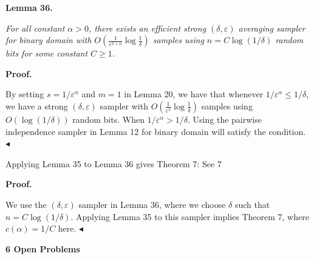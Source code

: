 

\par\medskip\noindent\textbf{
\textbf{Lemma 36}\textbf{.}
}\par



\emph{For all constant $\alpha>0$,
there exists an efficient strong $(\delta,\varepsilon)$ averaging sampler for binary domain with $O(\frac{1}{\varepsilon^{2+\alpha}}\log\frac{1}{\delta})$ samples using $n=C\log(1/\delta)$ random bits for some constant $C\geq 1$.}\par






\par\medskip\noindent\textbf{Proof.}\par




By setting $s=1/\varepsilon^{\alpha}$ and $m=1$ in Lemma 20, we have that whenever $1/\varepsilon^{\alpha}\leq 1/\delta$, we have a strong $(\delta,\varepsilon)$ sampler with $O(\frac{1}{\varepsilon^{2}}\log\frac{1}{\delta})$ samples using $O(\log(1/\delta))$ random bits. When $1/\varepsilon^{\alpha}>1/\delta$. Using the pairwise independence sampler in Lemma 12 for binary domain will satisfy the condition.
$\blacktriangleleft$\par




Applying Lemma 35 to Lemma 36
gives Theorem 7:
See 7\par





\par\medskip\noindent\textbf{Proof.}\par




We use the $(\delta,\varepsilon)$ sampler in Lemma 36, where we choose $\delta$ such that $n=C\log(1/\delta)$.
Applying Lemma 35 to this sampler implies Theorem 7, where $c(\alpha)=1/C$ here.
$\blacktriangleleft$\par







\par\medskip\noindent\textbf{
6 Open Problems}\par




